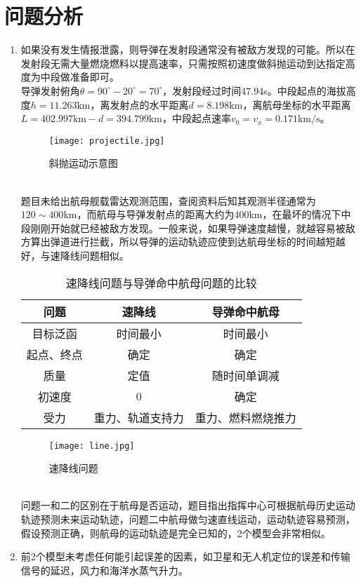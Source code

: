 \documentclass[UTF8]{article}
\begin{document}
\section{问题分析}
\begin{enumerate}[1]
\item 如果没有发生情报泄露，则导弹在发射段通常没有被敌方发现的可能。所以在发射段无需大量燃烧燃料以提高速率，只需按照初速度做斜抛运动到达指定高度为中段做准备即可。\\
导弹发射俯角\(\theta=90^\circ-20^\circ=70^\circ\)，发射段经过时间47.94s。中段起点的海拔高度\(h=11.263\textrm{km}\)，离发射点的水平距离\(d=8.198\textrm{km}\)，离航母坐标的水平距离\(L=402.997\textrm{km}-d=394.799\textrm{km}\)，中段起点速率\(v_0=v_x=0.171\textrm{km/s}\)。
\begin{figure}[htbp]
\small
\centering
\texttt{[image: projectile.jpg]}
\caption{斜抛运动示意图}
\end{figure}\\
题目未给出航母舰载雷达观测范围，查阅资料后知其观测半径通常为\(120\sim400\)km，而航母与导弹发射点的距离大约为400km，在最坏的情况下中段刚刚开始就已经被敌方发现。一般来说，如果导弹速度越慢，就越容易被敌方算出弹道进行拦截，所以导弹的运动轨迹应使到达航母坐标的时间越短越好，与速降线问题相似。
\begin{table}[htbp]
\centering
\caption{速降线问题与导弹命中航母问题的比较}
\begin{tabular}{|c|c|c|}
\hline
问题&速降线&导弹命中航母\\
\hline
目标泛函&时间最小&时间最小\\
\hline
起点、终点&确定&确定\\
\hline
质量&定值&随时间单调减\\
\hline
初速度&0&确定\\
\hline
受力&重力、轨道支持力&重力、燃料燃烧推力\\
\hline
\end{tabular}
\end{table}
\begin{figure}[htbp]
\small
\centering
\texttt{[image: line.jpg]}
\caption{速降线问题}
\end{figure}\\
问题一和二的区别在于航母是否运动，题目指出指挥中心可根据航母历史运动轨迹预测未来运动轨迹，问题二中航母做匀速直线运动，运动轨迹容易预测，假设预测正确，则航母的运动轨迹是完全已知的，2个模型会非常相似。
\item 前2个模型未考虑任何能引起误差的因素，如卫星和无人机定位的误差和传输信号的延迟，风力和海洋水蒸气升力。

\end{enumerate}
\end{document}
